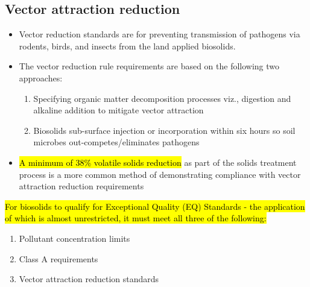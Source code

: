 \subsection{Vector attraction reduction} 
			\begin{itemize}
				\item Vector reduction standards are for preventing transmission of pathogens via rodents, birds, and insects from the land applied biosolids.
				\item The vector reduction rule requirements are based on the following two approaches: 
					\begin{enumerate}
						\item Specifying organic matter decomposition processes viz., digestion and alkaline addition to mitigate vector attraction
						\item Biosolids sub-surface injection or incorporation within six hours so soil microbes out-competes/eliminates pathogens
					\end{enumerate}
				\item \hl{A minimum of 38\% volatile solids reduction} as part of the solids treatment process is a more common method of demonstrating compliance with vector attraction reduction requirements
			\end{itemize}
		\hl{For biosolids to qualify for Exceptional Quality (EQ) Standards - the application of which is almost unrestricted, it must meet all three of the following:}
		\begin{enumerate}
			\item Pollutant concentration limits
			\item Class A requirements
			\item Vector attraction reduction standards
		\end{enumerate}
 


